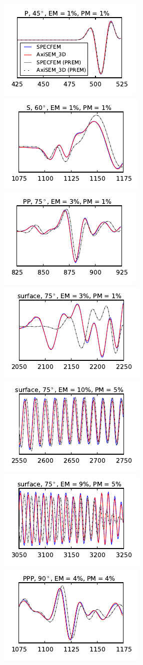 \documentclass[extra,referee]{gji}
\begin{document}
\begin{figure}
  \ContinuedFloat
  \centering
  \includegraphics[width=.25\textwidth]{fig/section/1.pdf}\hspace{-5pt}
  \includegraphics[width=.25\textwidth]{fig/section/2.pdf}\hspace{-5pt}
  \includegraphics[width=.25\textwidth]{fig/section/3.pdf}\hspace{-5pt}
  \includegraphics[width=.25\textwidth]{fig/section/4.pdf}\vspace{-5pt}
  \includegraphics[width=.25\textwidth]{fig/section/5.pdf}\hspace{-5pt}
  \includegraphics[width=.25\textwidth]{fig/section/6.pdf}\hspace{-5pt}
  \includegraphics[width=.25\textwidth]{fig/section/7.pdf}\hspace{-5pt}

\end{figure}
\end{document}
